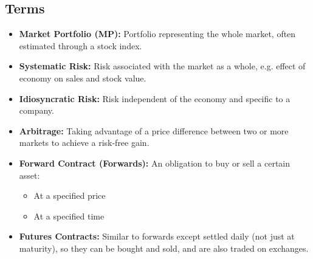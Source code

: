 \subsection{Terms}
\begin{terminology}
    \begin{itemize}
        \item \textbf{Market Portfolio (MP):} Portfolio representing the whole market, often estimated through a stock index.
        
        \item \textbf{Systematic Risk:} Risk associated with the market as a whole, e.g. effect of economy on sales and stock value.
        
        \item \textbf{Idiosyncratic Risk:} Risk independent of the economy and specific to a company.
        
        \item \textbf{Arbitrage:} Taking advantage of a price difference between two or more markets to achieve a risk-free gain.
        
        \item \textbf{Forward Contract (Forwards):} An obligation to buy or sell a certain asset:
        \begin{itemize}
            \item At a specified price
            \item At a specified time
        \end{itemize}
        
        \item \textbf{Futures Contracts:} Similar to forwards except settled daily (not just at maturity), so they can be bought and sold, and are also traded on exchanges.
    \end{itemize}
\end{terminology}

